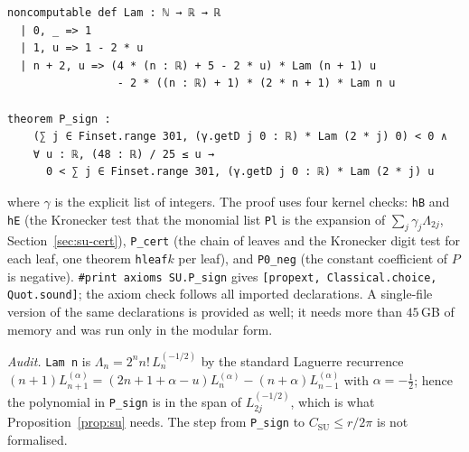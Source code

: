 \documentclass[11pt]{article}
\numberwithin{equation}{section}
\theoremstyle{definition}
\theoremstyle{remark}
\begin{document}
\begin{lstlisting}
noncomputable def Lam : ℕ → ℝ → ℝ
  | 0, _ => 1
  | 1, u => 1 - 2 * u
  | n + 2, u => (4 * (n : ℝ) + 5 - 2 * u) * Lam (n + 1) u
                 - 2 * ((n : ℝ) + 1) * (2 * n + 1) * Lam n u

theorem P_sign :
    (∑ j ∈ Finset.range 301, (γ.getD j 0 : ℝ) * Lam (2 * j) 0) < 0 ∧
    ∀ u : ℝ, (48 : ℝ) / 25 ≤ u →
      0 < ∑ j ∈ Finset.range 301, (γ.getD j 0 : ℝ) * Lam (2 * j) u
\end{lstlisting}
where $\gamma$ is the explicit list of integers. The proof uses four kernel checks: \texttt{hB} and
\texttt{hE} (the Kronecker test that the monomial list \texttt{Pl} is the expansion of
$\sum_j\gamma_j\Lambda_{2j}$, Section~\ref{sec:su-cert}), \texttt{P\_cert} (the chain of leaves and the
Kronecker digit test for each leaf, one theorem \texttt{hleaf}$k$ per leaf), and \texttt{P0\_neg} (the
constant coefficient of $P$ is negative). \texttt{\#print axioms SU.P\_sign} gives
\texttt{[propext, Classical.choice, Quot.sound]}; the axiom check follows all imported declarations. A
single-file version of the same declarations is provided as well; it needs more than $45$\,GB of memory
and was run only in the modular form.

\emph{Audit.} \texttt{Lam n} is $\Lambda_n=2^nn!\,L_n^{(-1/2)}$ by the standard Laguerre recurrence
$(n+1)L_{n+1}^{(\alpha)}=(2n+1+\alpha-u)L_n^{(\alpha)}-(n+\alpha)L_{n-1}^{(\alpha)}$ with $\alpha=-\frac12$;
hence the polynomial in \texttt{P\_sign} is in the span of $L_{2j}^{(-1/2)}$, which is what
Proposition~\ref{prop:su} needs. The step from \texttt{P\_sign} to $C_{\mathrm{SU}}\le r/2\pi$ is not
formalised.
\end{document}
